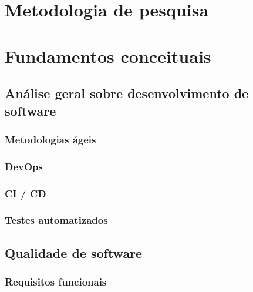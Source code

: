 \documentclass[]{../class/politex}
\begin{document}
  \capa
  \falsafolhaderosto
  \folhaderosto

  \sumario

  \begin{resumo}
  \end{resumo}

  \begin{abstract}
  \end{abstract}

  

  \chapter{Metodologia de pesquisa}

  

  \chapter{Fundamentos conceituais}

    \section{Análise geral sobre desenvolvimento de software}

      \subsection{Metodologias ágeis}

      \subsection{DevOps}

      \subsection{CI / CD}

      \subsection{Testes automatizados}

    \section{Qualidade de software}

      \subsection{Requisitos funcionais}
\end{document}
